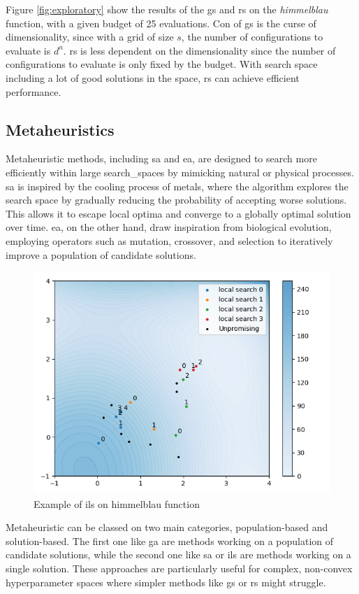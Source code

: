 Figure \ref{fig:exploratory} show the results of the \acrshort{gs} and \acrshort{rs} on the \textit{himmelblau} function, with a given budget of 25 evaluations. Con of \acrshort{gs} is the curse of dimensionality, since with a grid of size $s$, the number of configurations to evaluate is $d^n$. \acrshort{rs} is less dependent on the dimensionality since the number of configurations to evaluate is only fixed by the budget. With search space including a lot of good solutions in the space, \acrshort{rs} can achieve efficient performance.

\subsection{Metaheuristics} 
\label{sec:meta}  

Metaheuristic methods, including \acrfull{sa} and \acrfull{ea}, are designed to search more efficiently within large \glspl{search_space} by mimicking natural or physical processes. \acrshort{sa} is inspired by the cooling process of metals, where the algorithm explores the search space by gradually reducing the probability of accepting worse solutions. This allows it to escape local optima and converge to a globally optimal solution over time. \acrshort{ea}, on the other hand, draw inspiration from biological evolution, employing operators such as mutation, crossover, and selection to iteratively improve a population of candidate solutions.

\begin{figure}[h]
    \centering
    \includegraphics[width=0.4\linewidth]{assets/img/chap_2/plots/ils.png}
    \caption{Example of \acrfull{ils} on \gls{himmelblau} function}
    \label{fig:ils}
\end{figure}

Metaheuristic can be classed on two main categories, population-based and solution-based. The first one like \acrshort{ga} are methods working on a population of candidate solutions, while the second one like \acrshort{sa} or \acrfull{ils} are methods working on a single solution. These approaches are particularly useful for complex, non-convex hyperparameter spaces where simpler methods like \acrshort{gs} or \acrshort{rs} might struggle.



